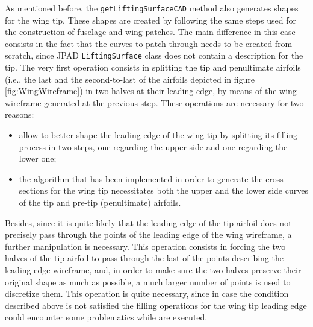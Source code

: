 \bigskip
\noindent
As mentioned before, the \lstinline[language=Java]!getLiftingSurfaceCAD! method also generates shapes for the wing tip. These shapes are created by following the same steps used for the construction of fuselage and wing patches. The main difference in this case consists in the fact that the curves to patch through needs to be created from scratch, since \gls{JPAD} \lstinline[language=Java]!LiftingSurface! class does not contain a description for the tip. The very first operation consists in splitting the tip and penultimate airfoils (i.e., the last and the second-to-last of the airfoils depicted in figure \ref{fig:WingWireframe}) in two halves at their leading edge, by means of the wing wireframe generated at the previous step. These operations are necessary for two reasons:
%
\begin{itemize}
\item allow to better shape the leading edge of the wing tip by splitting its filling process in two steps, one regarding the upper side and one regarding the lower one;
\item the algorithm that has been implemented in order to generate the cross sections for the wing tip necessitates both the upper and the lower side curves of the tip and pre-tip (penultimate) airfoils. 
\end{itemize}
%
Besides, since it is quite likely that the leading edge of the tip airfoil does not precisely pass through the points of the leading edge of the wing wireframe, a further manipulation is necessary. This operation consists in forcing the two halves of the tip airfoil to pass through the last of the points describing the leading edge wireframe, and, in order to make sure the two halves preserve their original shape as much as possible, a much larger number of points is used to discretize them. This operation is quite necessary, since in case the condition described above is not satisfied the filling operations for the wing tip leading edge could encounter some problematics while are executed. 

